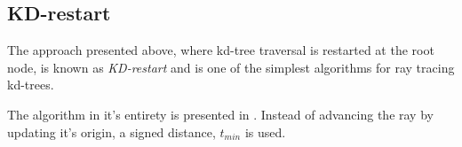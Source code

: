 \begin{figure}
{
    \label{fig:simpleTree}
  }
  \caption{}
\end{figure}


\subsection{KD-restart}\label{sec:kdRestart}


The approach presented above, where kd-tree traversal is restarted at
the root node, is known as \textit{KD-restart} and is one of the
simplest algorithms for ray tracing kd-trees.


The algorithm in it's entirety is presented in
. Instead of advancing the ray by updating it's
origin, a signed distance, $t_{min}$ is used.

